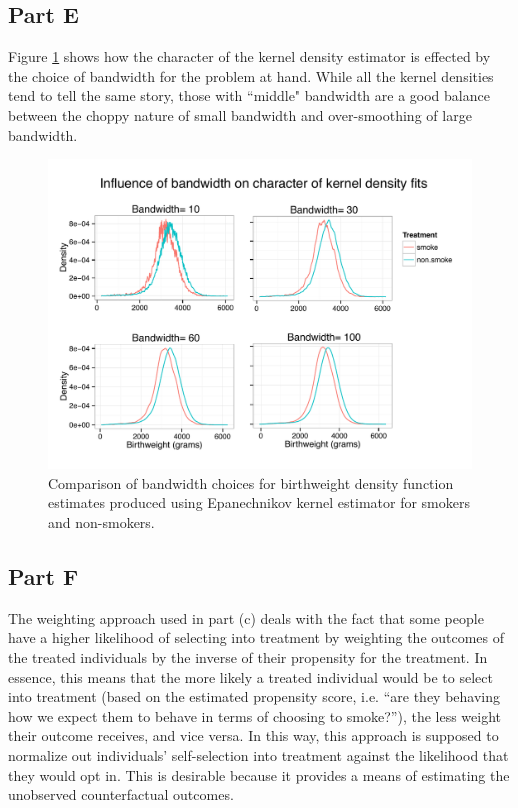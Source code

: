 \documentclass[letterpaper, 12pt]{article}
\begin{document}
\subsection{Part E}

Figure \ref{fig:kernelbw} shows how the character of the kernel density estimator is effected by the choice of bandwidth for the problem at hand.  While all the kernel densities tend to tell the same story, those with ``middle" bandwidth are a good balance between the choppy nature of small bandwidth and over-smoothing of large bandwidth.

\begin{figure}[h!]
   \centering
   \includegraphics[width=6in]{img/kdens-combinebw.pdf} 
   \caption{Comparison of bandwidth choices for birthweight density function estimates produced using Epanechnikov kernel estimator for smokers and non-smokers.}
   \label{fig:kernelbw}
\end{figure}

\subsection{Part F}
The weighting approach used in part (c) deals with the fact that some people have a higher likelihood of selecting into treatment by weighting the outcomes of the treated individuals by the inverse of their propensity for the treatment. In essence, this means that the more likely a treated individual would be to select into treatment (based on the estimated propensity score, i.e. ``are they behaving how we expect them to behave in terms of choosing to smoke?''), the less weight their outcome receives, and vice versa. In this way, this approach is supposed to normalize out individuals' self-selection into treatment against the likelihood that they would opt in. This is desirable because it provides a means of estimating the unobserved counterfactual outcomes. 
\end{document}
